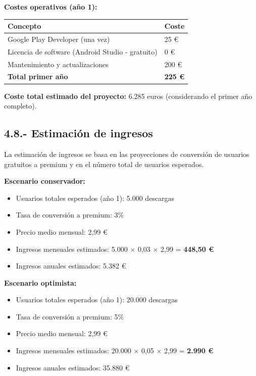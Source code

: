 \documentclass[
  spanish,
  11pt,
  paper=a4,
  ,captions=tableheading
]{scrartcl}
\providecommand{\tightlist}{%
  \setlength{\itemsep}{0pt}\setlength{\parskip}{0pt}}
\begin{document}
\textbf{Costes operativos (año 1):}

\begin{longtable}[]{@{}ll@{}}
\toprule\noalign{}
Concepto & Coste \\
\midrule\noalign{}
\endhead
\bottomrule\noalign{}
\endlastfoot
Google Play Developer (una vez) & 25 € \\
Licencia de software (Android Studio - gratuito) & 0 € \\
Mantenimiento y actualizaciones & 200 € \\
\textbf{Total primer año} & \textbf{225 €} \\
\end{longtable}

\textbf{Coste total estimado del proyecto:} 6.285 euros (considerando el
primer año completo).

\hypertarget{estimaciuxf3n-de-ingresos}{%
\subsection{4.8.- Estimación de
ingresos}\label{estimaciuxf3n-de-ingresos}}

La estimación de ingresos se basa en las proyecciones de conversión de
usuarios gratuitos a premium y en el número total de usuarios esperados.

\textbf{Escenario conservador:}

\begin{itemize}
\tightlist
\item
  Usuarios totales esperados (año 1): 5.000 descargas
\item
  Tasa de conversión a premium: 3\%
\item
  Precio medio mensual: 2,99 €
\item
  Ingresos mensuales estimados: 5.000 × 0,03 × 2,99 = \textbf{448,50 €}
\item
  Ingresos anuales estimados: 5.382 €
\end{itemize}

\textbf{Escenario optimista:}

\begin{itemize}
\tightlist
\item
  Usuarios totales esperados (año 1): 20.000 descargas
\item
  Tasa de conversión a premium: 5\%
\item
  Precio medio mensual: 2,99 €
\item
  Ingresos mensuales estimados: 20.000 × 0,05 × 2,99 = \textbf{2.990 €}
\item
  Ingresos anuales estimados: 35.880 €
\end{itemize}
\end{document}
